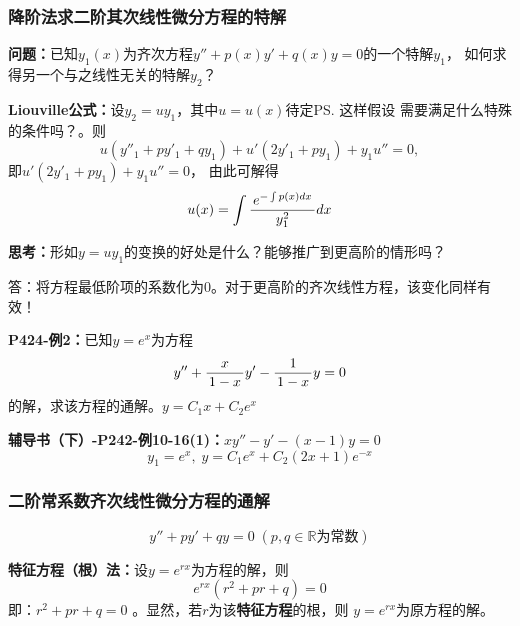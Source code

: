 \subsubsection{降阶法求二阶其次线性微分方程的特解}

{\bf 问题：}已知$y_1(x)$为齐次方程$y''+p(x)y'+q(x)y=0$的一个特解$y_1$，
如何求得另一个与之线性无关的特解$y_2$？

{\bf Liouville公式：}设$y_2=uy_1$，其中$u=u(x)$待定\ps{这样假设
需要满足什么特殊的条件吗？}。则
$$u{(y''_1+py'_1+qy_1)}+u'(2y'_1+py_1)+y_1u''=0,$$ 
即$u'(2y'_1+py_1)+y_1u''=0$， 由此可解得
$${u(x)=\displaystyle\int\displaystyle\frac{\,{e^{-\int p(x)dx}}\,}{\,{y_1^2}\,}dx}$$

{\bf 思考：}形如$y=uy_1$的变换的好处是什么？能够推广到更高阶的情形吗？

答：将方程最低阶项的系数化为$0$。对于更高阶的齐次线性方程，该变化同样有效！

{\bf P424-例2：}已知$y=e^x$为方程
$$y''+\displaystyle\frac{\,{x}\,}{\,{1-x}\,}y'-\displaystyle\frac{\,{1}\,}{\,{1-x}\,}y=0$$
的解，求该方程的通解。\hfill $y=C_1x+C_2e^x$

{\bf 辅导书（下）-P242-例10-16(1)：}$xy''-y'-(x-1)y=0$
$$y_1=e^x,\;y=C_1e^x+C_2(2x+1)e^{-x}$$

\subsubsection{二阶常系数齐次线性微分方程的通解}

$$y''+py'+qy=0\;(p,q\in\mathbb{R}\mbox{为常数})$$

{\bf 特征方程（根）法：}设$y=e^{rx}$为方程的解，则
$$e^{rx}(r^2+pr+q)=0$$ 
即：$r^2+pr+q=0$ 。显然，若$r$为该{\bf 特征方程}的根，则
$y=e^{rx}$为原方程的解。

